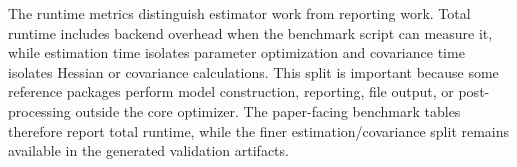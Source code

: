 The runtime metrics distinguish estimator work from reporting work.
Total runtime includes backend overhead when the benchmark script can measure it, while estimation time isolates parameter optimization and covariance time isolates Hessian or covariance calculations.
This split is important because some reference packages perform model construction, reporting, file output, or post-processing outside the core optimizer.
The paper-facing benchmark tables therefore report total runtime, while the finer estimation/covariance split remains available in the generated validation artifacts.
